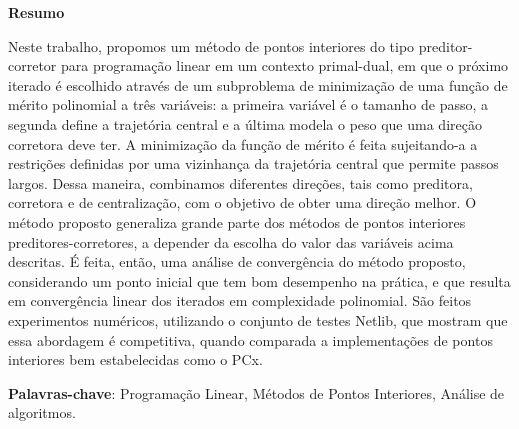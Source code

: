 \begin{center}
  \large{\textbf{Resumo}}
\end{center}
\onehalfspacing
Neste trabalho, propomos um método de pontos interiores do tipo preditor-corretor para programação linear em um contexto primal-dual, em que o próximo iterado é escolhido através de um subproblema de minimização de uma função de mérito polinomial a três variáveis: a primeira variável é o tamanho de passo, a segunda define a trajetória central e a última modela o peso que uma direção corretora deve ter.  A minimização da função de mérito é feita  sujeitando-a a restrições  definidas por uma vizinhança da trajetória central que permite passos largos. Dessa maneira, combinamos diferentes direções, tais como preditora, corretora e de centralização, com o objetivo de obter uma direção melhor. O método proposto generaliza grande parte dos métodos de pontos interiores preditores-corretores, a depender da escolha do valor das variáveis  acima descritas. É feita, então, uma análise de convergência do método proposto, considerando um ponto inicial que tem bom desempenho na prática, e que resulta em convergência linear dos iterados em complexidade polinomial. São feitos experimentos numéricos, utilizando o conjunto de testes Netlib, que mostram que essa abordagem é competitiva, quando comparada a implementações de pontos interiores bem estabelecidas como o PCx.





\textbf{Palavras-chave}:
Programação Linear, Métodos de Pontos Interiores, Análise de algoritmos.
